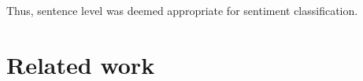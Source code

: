 \documentclass[a4paper,11pt]{kth-mag}
\newcommand{\todo}{ ... }
\begin{document}
Thus, sentence level was deemed appropriate for sentiment classification.%


%
%
%



\newpage
\section{Related work}
\end{document}
